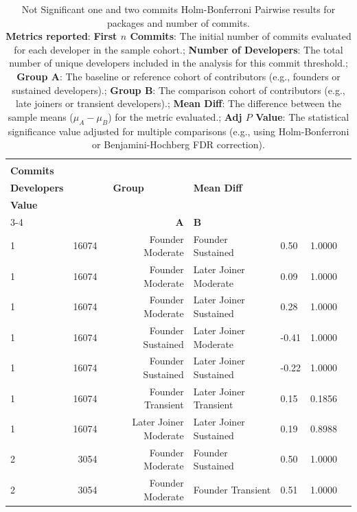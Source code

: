 \begin{table}[H]
\centering
\setlength{\tabcolsep}{2pt}
\caption[Not Significant Holm-Bonferroni Pairwise one and two commits results packages]{Not Significant one and two commits Holm-Bonferroni Pairwise results for packages and number of commits. \\ \textbf{Metrics reported}:   \textbf{First $n$ Commits}: The initial number of commits evaluated for each developer in the sample cohort.;  \textbf{Number of Developers}: The total number of unique developers included in the analysis for this commit threshold.;  \textbf{Group A}: The baseline or reference cohort of contributors (e.g., founders or sustained developers).;  \textbf{Group B}: The comparison cohort of contributors (e.g., late joiners or transient developers).;  \textbf{Mean Diff}: The difference between the sample means ($\mu_A - \mu_B$) for the metric evaluated.;  \textbf{Adj $P$ Value}: The statistical significance value adjusted for multiple comparisons (e.g., using Holm-Bonferroni or Benjamini-Hochberg FDR correction).
}
\begin{tabular}{l r r l l r r}
\toprule
\makecell[t]{\textbf{First $n$}\\\textbf{Commits}} & \makecell[t]{\textbf{Number of}\\\textbf{Developers}} & \multicolumn{2}{c}{\textbf{Group}} & \textbf{Mean Diff} & \makecell[t]{\textbf{Adj $P$}\\\textbf{Value}} \\ 
\cmidrule(lr){3-4}
 &  & \textbf{A} & \textbf{B} &  &  \\ 
\midrule
1 & 16074 & Founder Moderate & Founder Sustained & 0.50 & 1.0000 \\ 
1 & 16074 & Founder Moderate & Later Joiner Moderate & 0.09 & 1.0000 \\ 
1 & 16074 & Founder Moderate & Later Joiner Sustained & 0.28 & 1.0000 \\ 
1 & 16074 & Founder Sustained & Later Joiner Moderate & -0.41 & 1.0000 \\ 
1 & 16074 & Founder Sustained & Later Joiner Sustained & -0.22 & 1.0000 \\ 
1 & 16074 & Founder Transient & Later Joiner Transient & 0.15 & 0.1856 \\ 
1 & 16074 & Later Joiner Moderate & Later Joiner Sustained & 0.19 & 0.8988 \\ 
2 & 3054 & Founder Moderate & Founder Sustained & 0.50 & 1.0000 \\ 
2 & 3054 & Founder Moderate & Founder Transient & 0.51 & 1.0000 \\ 

\end{tabular}
\end{table}
